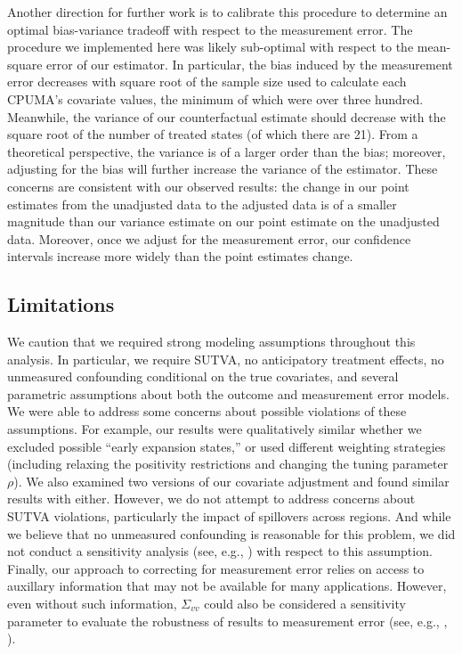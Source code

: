 \documentclass[aoas]{imsart}
\theoremstyle{plain}
\theoremstyle{remark}
\begin{document}
Another direction for further work is to calibrate this procedure to determine an optimal bias-variance tradeoff with respect to the measurement error. The procedure we implemented here was likely sub-optimal with respect to the mean-square error of our estimator. In particular, the bias induced by the measurement error decreases with square root of the sample size used to calculate each CPUMA's covariate values, the minimum of which were over three hundred. Meanwhile, the variance of our counterfactual estimate should decrease with the square root of the number of treated states (of which there are 21). From a theoretical perspective, the variance is of a larger order than the bias; moreover, adjusting for the bias will further increase the variance of the estimator. These concerns are consistent with our observed results: the change in our point estimates from the unadjusted data to the adjusted data is of a smaller magnitude than our variance estimate on our point estimate on the unadjusted data. Moreover, once we adjust for the measurement error, our confidence intervals increase more widely than the point estimates change.

\subsection{Limitations}

We caution that we required strong modeling assumptions throughout this analysis. In particular, we require SUTVA, no anticipatory treatment effects, no unmeasured confounding conditional on the true covariates, and several parametric assumptions about both the outcome and measurement error models. We were able to address some concerns about possible violations of these assumptions. For example, our results were qualitatively similar whether we excluded possible ``early expansion states,'' or used different weighting strategies (including relaxing the positivity restrictions and changing the tuning parameter $\rho$). We also examined two versions of our covariate adjustment and found similar results with either. However, we do not attempt to address concerns about SUTVA violations, particularly the impact of spillovers across regions. And while we believe that no unmeasured confounding is reasonable for this problem, we did not conduct a sensitivity analysis (see, e.g., \cite{bonvini2021sensitivity}) with respect to this assumption. Finally, our approach to correcting for measurement error relies on access to auxillary information that may not be available for many applications. However, even without such information, $\Sigma_{vv}$ could also be considered a sensitivity parameter to evaluate the robustness of results to measurement error (see, e.g., \cite{huque2014impact}, \cite{illenberger2020impact}).
\end{document}
